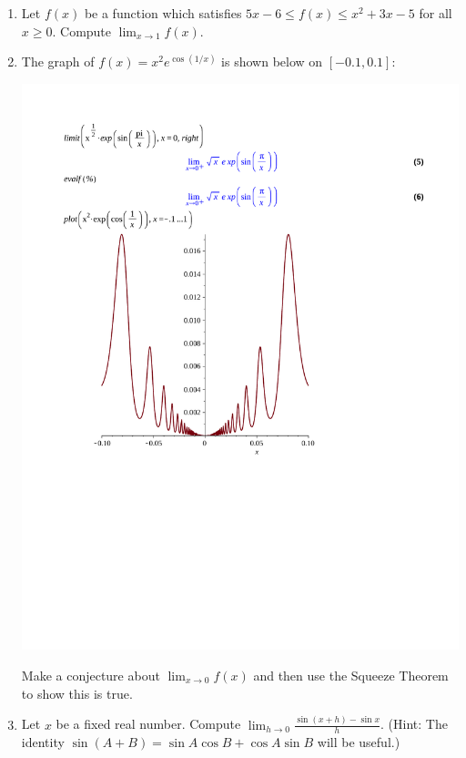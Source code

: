 \documentclass[12pt]{article}
\newif\ifans
\begin{document}
\begin{enumerate}
\item Let $f(x)$ be a function which satisfies $\displaystyle 5x-6 \leq f(x) \leq x^2+3x-5$ for all $x \geq 0$.  Compute $\displaystyle \lim_{x \rightarrow 1}{f(x)}$.

\ifans{\fbox{$-1$}} \fi

\item The graph of $\displaystyle f(x)=x^2e^{\cos{(1/x)}}$ is shown below on $[-0.1,0.1]$:\\

\begin{center}
\includegraphics[scale=.6]{squeezegraph.pdf}
\end{center}

Make a conjecture about $\displaystyle \lim_{x \rightarrow 0}{f(x)}$ and then use the Squeeze Theorem to show this is true.

\ifans{\fbox{\parbox{1\linewidth}{Claim: $\displaystyle \lim_{x\rightarrow 0}{f(x)}=0$\\
Proof: We can bound $\displaystyle f(x)=x^2e^{\cos{(1/x)}}$ above by $ex^2$ and below by $e^{-1}x^2$, both of which approach 0 as $x$ approaches 0.  Thus, by the squeeze theorem, $f(x) \rightarrow 0$ as well when $x \rightarrow 0$.}}} \fi

\item Let $x$ be a fixed real number.  Compute $\lim_{h \rightarrow 0}\frac{\sin{(x+h)}-\sin{x}}{h}$.  (Hint: The identity $\sin{(A+B)}=\sin{A}\cos{B}+\cos{A}\sin{B}$ will be useful.)

\ifans{\fbox{$\cos{x}$}} \fi

\end{enumerate}
\end{document}
